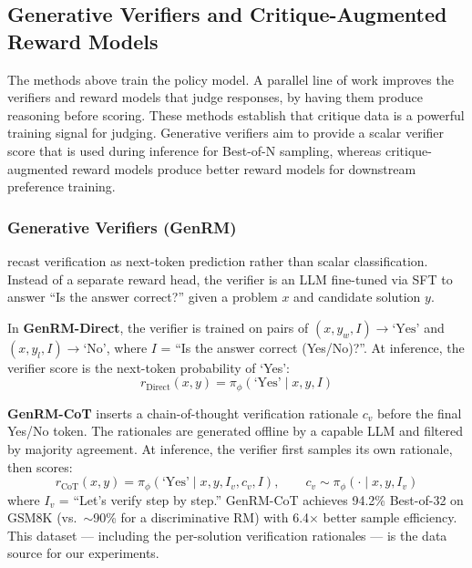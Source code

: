 \documentclass[11pt]{article}
\begin{document}
\subsection{Generative Verifiers and Critique-Augmented Reward Models}
\label{sec:gen-verify}

The methods above train the policy model. A parallel line of work improves the verifiers and reward models that judge responses, by having them produce reasoning before scoring. These methods establish that critique data is a powerful training signal for judging. Generative verifiers aim to provide a scalar verifier score that is used during inference for Best-of-N sampling, whereas critique-augmented reward models produce better reward models for downstream preference training.

\subsubsection{Generative Verifiers (GenRM)}
\label{sec:genrm}

\autocite{zhang2024generativeverifiersrewardmodeling} recast verification as next-token prediction rather than scalar classification. Instead of a separate reward head, the verifier is an LLM fine-tuned via SFT to answer ``Is the answer correct?'' given a problem $x$ and candidate solution $y$.

In \textbf{GenRM-Direct}, the verifier is trained on pairs of $(x, y_w, I) \to \text{`Yes'}$ and $(x, y_l, I) \to \text{`No'}$, where $I$ = ``Is the answer correct (Yes/No)?''. At inference, the verifier score is the next-token probability of `Yes':
\begin{equation}
    r_{\text{Direct}}(x, y) = \pi_\phi(\text{`Yes'} \mid x, y, I)
    \label{eq:genrm_direct}
\end{equation}

\textbf{GenRM-CoT} inserts a chain-of-thought verification rationale $c_v$ before the final Yes/No token. The rationales are generated offline by a capable LLM and filtered by majority agreement. At inference, the verifier first samples its own rationale, then scores:
\begin{equation}
    r_{\text{CoT}}(x, y) = \pi_\phi(\text{`Yes'} \mid x, y, I_v, c_v, I), \qquad c_v \sim \pi_\phi(\cdot \mid x, y, I_v)
    \label{eq:genrm_cot}
\end{equation}
where $I_v$ = ``Let's verify step by step.'' GenRM-CoT achieves 94.2\% Best-of-32 on GSM8K (vs.\ ${\sim}$90\% for a discriminative RM) with 6.4$\times$ better sample efficiency. This dataset --- including the per-solution verification rationales --- is the data source for our experiments.
\end{document}
